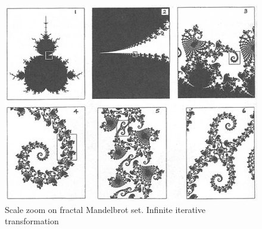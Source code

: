 \documentclass{UIdahoMastersThesis}
\begin{document}
\newpage
\begin{figure}[h!]
	\centering
	\includegraphics[width=.81\linewidth]{mandel.png}
	\caption{Scale zoom on fractal Mandelbrot set. Infinite iterative transformation}
	\label{fig:mandel}
\end{figure}
\end{document}
